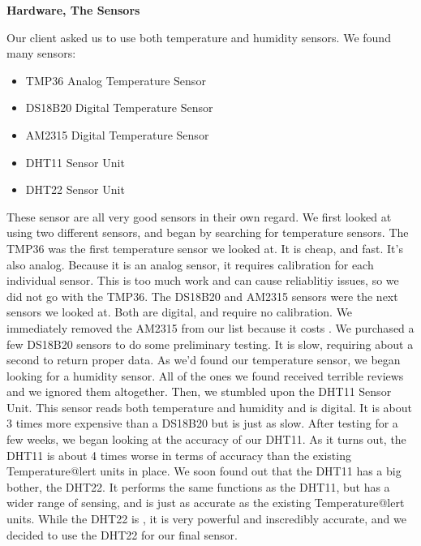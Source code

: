 \documentclass{report}
\begin{document}
\begin{center}
	\textbf{Hardware, The Sensors}
\end{center}
\indent
Our client asked us to use both temperature and humidity sensors. We found many sensors:
\begin{itemize}
	\item TMP36 Analog Temperature Sensor
	\item DS18B20 Digital Temperature Sensor
	\item AM2315 Digital Temperature Sensor
	\item DHT11 Sensor Unit
	\item DHT22 Sensor Unit
\end{itemize}
These sensor are all very good sensors in their own regard. We first looked at using two different sensors, and began by searching for temperature sensors.
\newline
\indent
The TMP36 was the first temperature sensor we looked at. It is cheap, and fast. It's also analog. Because it is an analog sensor, it requires calibration for each individual sensor. This is too much work and can cause reliablitiy issues, so we did not go with the TMP36.
\newline
\indent
The DS18B20 and AM2315 sensors were the next sensors we looked at. Both are digital, and require no calibration. We immediately removed the AM2315 from our list because it costs . We purchased a few DS18B20 sensors to do some preliminary testing. It is slow, requiring about a second to return proper data.
\newline
\indent
As we'd found our temperature sensor, we began looking for a humidity sensor. All of the ones we found received terrible reviews and we ignored them altogether. Then, we stumbled upon the DHT11 Sensor Unit. This sensor reads both temperature and humidity and is digital. It is about 3 times more expensive than a DS18B20 but is just as slow.
\newline
\indent
After testing for a few weeks, we began looking at the accuracy of our DHT11. As it turns out, the DHT11 is about 4 times worse in terms of accuracy than the existing  Temperature@lert units in place. We soon found out that the DHT11 has a big bother, the DHT22. It performs the same functions as the DHT11, but has a wider range of sensing, and is just as accurate as the existing Temperature@lert units. While the DHT22 is , it is very powerful and inscredibly accurate, and we decided to use the DHT22 for our final sensor.
\newpage
\end{document}
